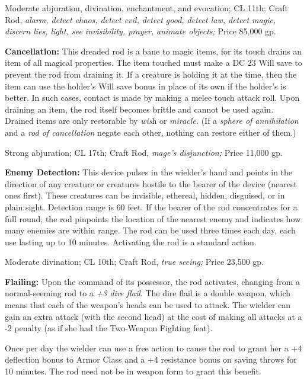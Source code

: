 Moderate abjuration, divination, enchantment, and evocation; CL 11th; Craft Rod, 
\textit{alarm, detect chaos, detect evil, detect good, detect law, detect magic, 
discern lies, light, see invisibility, prayer, animate objects; }Price 85,000 gp.

\textbf{Cancellation:} This dreaded rod is a bane to magic items, for its touch 
drains an item of all magical properties. The item touched must make a DC 23 Will 
save to prevent the rod from draining it. If a creature is holding it at the time, 
then the item can use the holder's Will save bonus in place of its own if the holder's 
is better. In such cases, contact is made by making a melee touch attack roll. 
Upon draining an item, the rod itself becomes brittle and cannot be used again. 
Drained items are only restorable by \textit{wis}h or \textit{miracle. }(If a \textit{sphere 
of annihilation }and a \textit{rod of cancellation }negate each other, nothing 
can restore either of them.)

Strong abjuration; CL 17th; Craft Rod, \textit{mage's disjunction; }Price 11,000 
gp.

\textbf{Enemy Detection: }This device pulses in the wielder's hand and points in 
the direction of any creature or creatures hostile to the bearer of the device 
(nearest ones first). These creatures can be invisible, ethereal, hidden, disguised, 
or in plain sight. Detection range is 60 feet. If the bearer of the rod concentrates 
for a full round, the rod pinpoints the location of the nearest enemy and indicates 
how many enemies are within range. The rod can be used three times each day, each 
use lasting up to 10 minutes. Activating the rod is a standard action.

Moderate divination; CL 10th; Craft Rod, \textit{true seeing; }Price 23,500 gp.

\textbf{Flailing: }Upon the command of its possessor, the rod activates, changing 
from a normal-seeming rod to a \textit{+3 dire flail}. The dire flail is a double 
weapon, which means that each of the weapon's heads can be used to attack. The 
wielder can gain an extra attack (with the second head) at the cost of making all 
attacks at a -2 penalty (as if she had the Two-Weapon Fighting feat).

Once per day the wielder can use a free action to cause the rod to grant her a 
+4 deflection bonus to Armor Class and a +4 resistance bonus on saving throws for 
10 minutes. The rod need not be in weapon form to grant this benefit.

